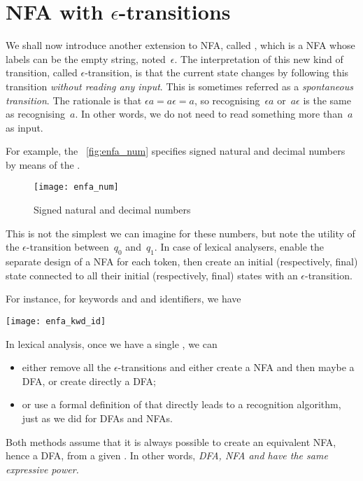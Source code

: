 \section{NFA with $\epsilon$-transitions}

We shall now introduce another extension to NFA, called \eNFA, which
is a NFA whose labels can be the empty string, noted~\(\epsilon\).
The interpretation of this new kind of transition, called
\(\epsilon\)-transition, is that the current state changes by
following this transition \emph{without reading any input}. This is
sometimes referred as a \emph{spontaneous transition}. The rationale
is that \(\epsilon a = a \epsilon = a\), so recognising~\(\epsilon a\)
or~\(a\epsilon\) is the same as recognising~\(a\). In other words, we
do not need to read something more than~\(a\) as input.

For example, the \fig~\vref{fig:enfa_num} specifies signed natural and
decimal numbers by means of the \eNFA.
\begin{figure}
\centering
\texttt{[image: enfa\_num]}
\caption{Signed natural and decimal numbers\label{fig:enfa_num}}
\end{figure}
This is not the simplest \eNFA we can imagine for these numbers, but
note the utility of the \(\epsilon\)-transition between~\(q_0\)
and~\(q_1\). In case of lexical analysers,  enable the
separate design of a NFA for each token, then create an initial
(respectively, final) state connected to all their initial
(respectively, final) states with an \(\epsilon\)-transition.

For instance, for keywords  and  and
identifiers, we have
\begin{center}
\texttt{[image: enfa\_kwd\_id]}
\end{center}
In lexical analysis, once we have a single \eNFA, we can
\begin{itemize}

  \item either remove all the \(\epsilon\)-transitions and either create
  a NFA and then maybe a DFA, or create directly a DFA;

  \item or use a formal definition of \eNFA that directly leads to a
  recognition algorithm, just as we did for DFAs and NFAs.

\end{itemize}
Both methods assume that it is always possible to create an equivalent
NFA, hence a DFA, from a given \eNFA.  In other words, \emph{DFA, NFA
  and \eNFA have the same expressive power.}

